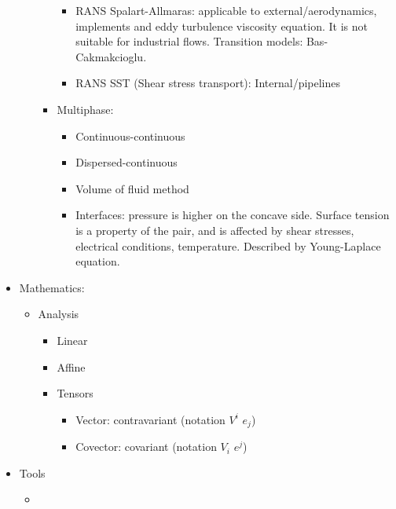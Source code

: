 \documentclass{article}
\begin{document}
\begin{itemize}
\begin{itemize}
\begin{itemize}
			\begin{itemize}
				\item RANS Spalart-Allmaras: applicable to external/aerodynamics, implements and eddy turbulence viscosity equation. It is not suitable for industrial flows. Transition models: Bas-Cakmakcioglu.
				\item RANS SST (Shear stress transport): Internal/pipelines
			\end{itemize}
			\item Multiphase:
			\begin{itemize}
				\item Continuous-continuous
				\item Dispersed-continuous
				\item Volume of fluid method
				\item Interfaces: pressure is higher on the concave side. Surface tension is a property of the pair, and is affected by shear stresses, electrical conditions, temperature. Described by Young-Laplace equation.
			\end{itemize}
		\end{itemize}
	\end{itemize}
	\item Mathematics:
	\begin{itemize}
		\item Analysis
		\begin{itemize}
			\item Linear
			\item Affine
			\item Tensors
			\begin{itemize}
				\item Vector: contravariant (notation $V^i$ $e_j$)
				\item Covector: covariant (notation $V_i$ $e^j$)
			\end{itemize}
		\end{itemize}
	\end{itemize}
	\item Tools
	\begin{itemize}
		\item 
	\end{itemize}
\end{itemize}
\end{document}
